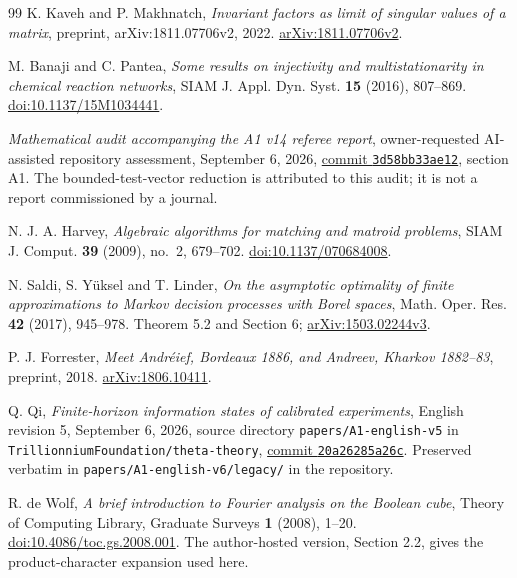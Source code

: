 \begin{thebibliography}{99}
K. Kaveh and P. Makhnatch, \emph{Invariant factors as limit of singular
values of a matrix}, preprint, arXiv:1811.07706v2, 2022.
\href{https://arxiv.org/abs/1811.07706v2}{arXiv:1811.07706v2}.

M. Banaji and C. Pantea, \emph{Some results on injectivity and
multistationarity in chemical reaction networks}, SIAM J. Appl. Dyn.
Syst. \textbf{15} (2016), 807--869.
\href{https://doi.org/10.1137/15M1034441}{doi:10.1137/15M1034441}.

\emph{Mathematical audit accompanying the A1 v14 referee report},
owner-requested AI-assisted repository assessment, September 6, 2026,
\href{https://github.com/TrillionniumFoundation/theta-theory/blob/3d58bb33ae122ebb2430874e2a57a5863e6a876a/reviews/a1-english-v14-geometric-2026-09-06/MATHEMATICAL_AUDIT.md}{commit \texttt{3d58bb33ae12}}, section A1.
The bounded-test-vector reduction is attributed to this audit;
it is not a report commissioned by a journal.

N. J. A. Harvey, \emph{Algebraic algorithms for matching and matroid
problems}, SIAM J. Comput. \textbf{39} (2009), no.~2, 679--702.
\href{https://doi.org/10.1137/070684008}{doi:10.1137/070684008}.

N. Saldi, S. Y\"uksel and T. Linder,
\emph{On the asymptotic optimality of finite approximations to Markov
 decision processes with Borel spaces}, Math. Oper. Res. \textbf{42}
(2017), 945--978. Theorem 5.2 and Section 6;
\href{https://arxiv.org/abs/1503.02244v3}{arXiv:1503.02244v3}.

P. J. Forrester, \emph{Meet Andr\'eief, Bordeaux 1886, and Andreev,
Kharkov 1882--83}, preprint, 2018.
\href{https://arxiv.org/abs/1806.10411}{arXiv:1806.10411}.

Q. Qi, \emph{Finite-horizon information states of calibrated experiments},
English revision 5, September 6, 2026, source directory
\texttt{papers/A1-english-v5} in \texttt{TrillionniumFoundation/theta-theory},
\href{https://github.com/TrillionniumFoundation/theta-theory/tree/20a26285a26cb468206b771c38166fd216283af0/papers/A1-english-v5}{commit \texttt{20a26285a26c}}.
Preserved verbatim in \texttt{papers/A1-english-v6/legacy/} in the repository.

R. de Wolf, \emph{A brief introduction to Fourier analysis on the Boolean
cube}, Theory of Computing Library, Graduate Surveys \textbf{1} (2008),
1--20. \href{https://doi.org/10.4086/toc.gs.2008.001}{doi:10.4086/toc.gs.2008.001}.
The author-hosted version, Section 2.2, gives the product-character
expansion used here.


\end{thebibliography}
